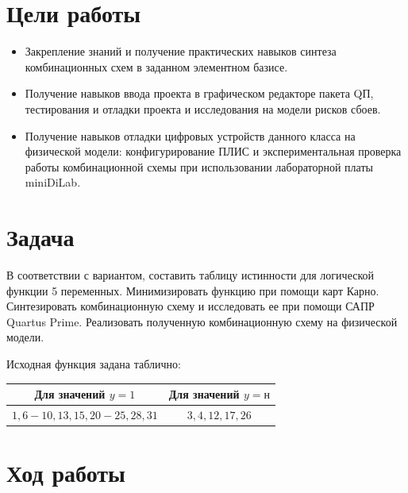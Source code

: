 \documentclass[a4paper,12pt]{article}
\begin{document}
    

    \tableofcontents

    \section{Цели работы}
    \begin{itemize}
        \item Закрепление знаний и получение практических навыков синтеза комбинационных схем в заданном
        элементном базисе.
        \item Получение навыков ввода проекта в графическом редакторе пакета QП, тестирования и отладки проекта и
        исследования на модели рисков сбоев.
        \item Получение навыков отладки цифровых устройств данного класса на физической модели: конфигурирование ПЛИС и
        экспериментальная проверка работы комбинационной схемы при использовании лабораторной платы miniDiLab.
    \end{itemize}

    \section{Задача}
	В соответствии с вариантом, составить таблицу истинности для логической функции 5 переменных. Минимизировать функцию при помощи карт
	Карно. Синтезировать комбинационную схему и исследовать ее при помощи САПР Quartus Prime. Реализовать полученную
	комбинационную схему на физической модели.
	
	Исходная функция задана таблично:
	\begin{table}[H]
		\centering
		\begin{tabular}{|c|c|}
		\hline Для значений $y = 1$ & Для значений $y = \textit{н}$ \\
		\hline $1, 6-10, 13, 15, 20-25, 28, 31$ & $3, 4, 12, 17, 26$ \\
		\hline
		\end{tabular}
	\end{table}
    \section{Ход работы}
\end{document}
